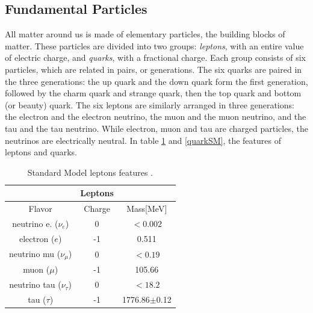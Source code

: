 \subsection{Fundamental Particles}
\label{cap1:pi}
All matter around us is made of elementary particles, the building blocks of matter. These particles are divided into two groups: \textit{leptons}, with an entire value of electric charge, and \textit{quarks}, with a fractional charge. Each group consists of six particles, which are related in pairs, or generations. The six quarks are paired in the three generations: the up quark and the down quark form the first generation, followed by the charm quark and strange quark, then the top quark and bottom (or beauty) quark.  The six leptons are similarly arranged in three generations: the electron and the electron neutrino, the muon and the muon neutrino, and the tau and the tau neutrino. While electron, muon and tau are charged particles, the neutrinos are electrically neutral. In table \ref{leptonsSM} and \ref{quarkSM}, the features of leptons and quarks.
\begin{table}[ht]	
	\begin{center}
		\begin{tabular}{|ccc|}
			\hline     & \textbf{Leptons} &   \\
			\hline   Flavor & Charge & Mass[MeV]  \\
			\hline
			\hline
			 neutrino e. ($\nu_{e}$) & 0 & $<0.002$   \\
			 electron ($e$) & -1 & 0.511   \\
			\hline
			 neutrino mu ($\nu_{\mu}$) & 0 & $<0.19$   \\
			 muon ($\mu$) & -1 & 105.66   \\
			\hline
			 neutrino tau ($\nu_{\tau}$) & 0 & $<18.2$ \\
			 tau ($\tau$) & -1 & 1776.86$\pm$0.12  \\
			\hline
			\hline
		\end{tabular}
	\end{center}
	\caption{Standard Model leptons features \cite{PDG}.}
	\label{leptonsSM}
\end{table}

